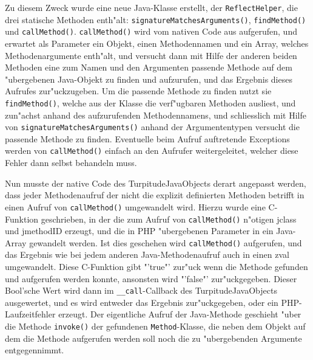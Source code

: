 Zu diesem Zweck wurde eine neue Java-Klasse erstellt, der \texttt{ReflectHelper}, die drei statische Methoden enth"alt:
\texttt{signatureMatchesArguments()}, \texttt{findMethod()} und \texttt{callMethod()}. 
\texttt{callMethod()} wird vom nativen Code aus aufgerufen, und erwartet als Parameter ein Objekt, einen Methodennamen und ein 
Array, welches Methodenargumente enth"alt, und versucht dann mit Hilfe der anderen beiden Methoden eine zum Namen und den Argumenten 
passende Methode auf dem "ubergebenen Java-Objekt zu finden und aufzurufen, und das Ergebnis dieses Aufrufes zur"uckzugeben.
Um die passende Methode zu finden nutzt sie \texttt{findMethod()}, welche aus der Klasse die verf"ugbaren Methoden ausliest, und 
zun"achst anhand des aufzurufenden Methodennamens, und schliesslich mit Hilfe von \texttt{signatureMatchesArguments()} anhand der
Argumententypen versucht die passende Methode zu finden. Eventuelle beim Aufruf auftretende Exceptions werden von \texttt{callMethod()}
einfach an den Aufrufer weitergeleitet, welcher diese Fehler dann selbst behandeln muss.

Nun musste der native Code des TurpitudeJavaObjects derart angepasst werden, dass jeder Methodenaufruf der nicht die explizit
definierten Methoden betrifft in einen Aufruf von \texttt{callMethod()} umgewandelt wird. Hierzu wurde eine C-Funktion geschrieben,
in der die zum Aufruf von \texttt{callMethod()} n"otigen jclass und jmethodID erzeugt, und die in PHP "ubergebenen Parameter
in ein Java-Array gewandelt werden. Ist dies geschehen wird \texttt{callMethod()} aufgerufen, und das Ergebnis wie bei jedem
anderen Java-Methodenaufruf auch in einen zval umgewandelt. Diese C-Funktion gibt "'true"' zur"uck wenn die Methode gefunden
und aufgerufen werden konnte, ansonsten wird "'false"' zur"uckgegeben. Dieser Bool'sche Wert wird dann im \texttt{\_\_call}-Callback
des TurpitudeJavaObjects ausgewertet, und es wird entweder das Ergebnis zur"uckgegeben, oder ein PHP-Laufzeitfehler erzeugt.
Der eigentliche Aufruf der Java-Methode geschieht "uber die Methode \texttt{invoke()} der gefundenen \texttt{Method}-Klasse, die neben
dem Objekt auf dem die Methode aufgerufen werden soll noch die zu "ubergebenden Argumente entgegennimmt.


